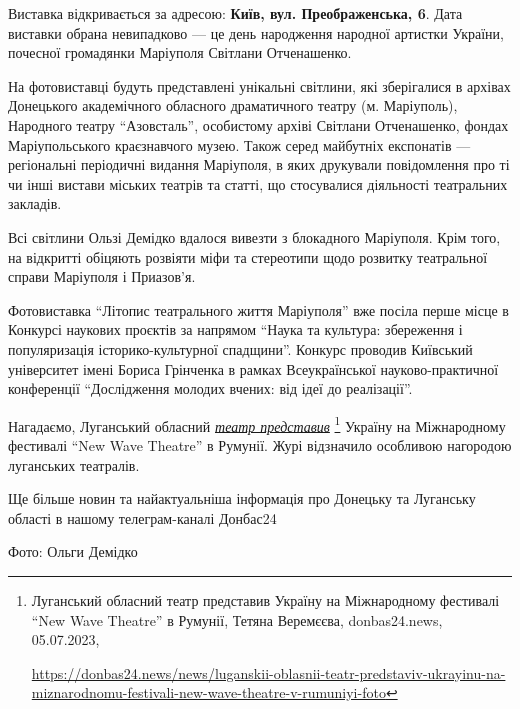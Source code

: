Виставка відкривається за адресою: \textbf{Київ, вул. Преображенська, 6}. Дата виставки
обрана невипадково — це день народження народної артистки України, почесної
громадянки Маріуполя Світлани Отченашенко.


На фотовиставці будуть представлені унікальні світлини, які зберігалися в
архівах Донецького академічного обласного драматичного театру (м. Маріуполь),
Народного театру \enquote{Азовсталь}, особистому архіві Світлани Отченашенко, фондах
Маріупольського краєзнавчого музею. Також серед майбутніх експонатів —
регіональні періодичні видання Маріуполя, в яких друкували повідомлення про ті
чи інші вистави міських театрів та статті, що стосувалися діяльності
театральних закладів.


Всі світлини Ользі Демідко вдалося вивезти з блокадного Маріуполя. Крім того,
на відкритті обіцяють розвіяти міфи та стереотипи щодо розвитку театральної
справи Маріуполя і Приазов'я.


Фотовиставка \enquote{Літопис театрального життя Маріуполя} вже посіла перше місце в
Конкурсі наукових проєктів за напрямом \enquote{Наука та культура: збереження і
популяризація історико-культурної спадщини}. Конкурс проводив Київський
університет імені Бориса Грінченка в рамках Всеукраїнської науково-практичної
конференції \enquote{Дослідження молодих вчених: від ідеї до реалізації}.

Нагадаємо, Луганський обласний \href{https://donbas24.news/news/luganskii-oblasnii-teatr-predstaviv-ukrayinu-na-miznarodnomu-festivali-new-wave-theatre-v-rumuniyi-foto}{\emph{театр представив}}%
\footnote{Луганський обласний театр представив Україну на Міжнародному фестивалі \enquote{New Wave Theatre} в Румунії, Тетяна Веремєєва, donbas24.news, 05.07.2023, \par\url{https://donbas24.news/news/luganskii-oblasnii-teatr-predstaviv-ukrayinu-na-miznarodnomu-festivali-new-wave-theatre-v-rumuniyi-foto}}
Україну на Міжнародному
фестивалі \enquote{New Wave Theatre} в Румунії. Журі відзначило особливою нагородою
луганських театралів.

Ще більше новин та найактуальніша інформація про Донецьку та Луганську області
в нашому телеграм-каналі Донбас24

Фото: Ольги Демідко
